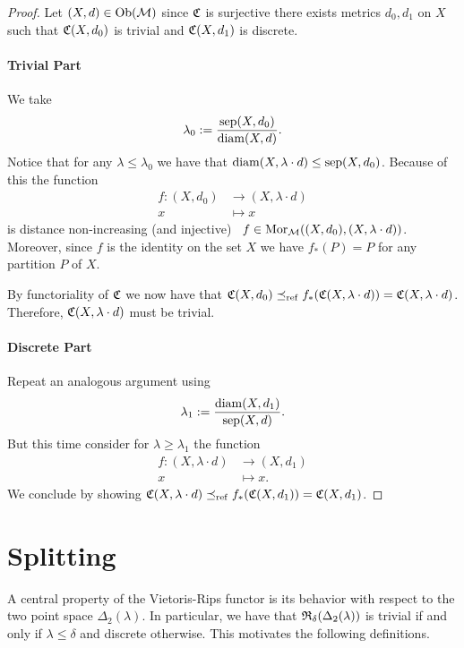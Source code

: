 \begin{proof}
    Let $(X,d) \in \mathrm {Ob}(\mathcal{M})$ since $\mathfrak{C}$ is surjective there exists metrics $d_0, d_1$ on $X$ such that $\mathfrak{C}(X,d_0)$ is trivial and $\mathfrak{C}(X,d_1)$ is discrete.

    \paragraph*{Trivial Part} We take
    $$
    \lambda_0 := \frac{\mathrm{sep}(X,d_0)}{\mathrm{diam}(X,d)}.
    $$ 
    Notice that for any $\lambda \le \lambda_0$ we have that $\mathrm{diam}(X,\lambda \cdot d) \le \mathrm{sep}(X,d_0)$.
    Because of this the function
    \begin{align*}
        f: (X, d_0) &\longrightarrow (X, \lambda \cdot d)\\
        x &\longmapsto x
    \end{align*}
    is distance non-increasing (and injective) \ie\ $f \in \mathrm {Mor}_{\mathcal{M}}((X,d_0), (X,\lambda \cdot d))$. Moreover, since $f$ is the identity on the set $X$ we have $f_*(P) = P$ for any partition $P$ of $X$.

    By functoriality of $\mathfrak{C}$ we now have that $\mathfrak{C}(X,d_0) \preceq_\mathrm{ref} f_*(\mathfrak{C}(X,\lambda \cdot d)) = \mathfrak{C}(X,\lambda \cdot d)$. Therefore, $\mathfrak{C}(X,\lambda \cdot d)$ must be trivial.

    \paragraph*{Discrete Part} Repeat an analogous argument using
    $$
    \lambda_1 := \frac{\mathrm{diam}(X,d_1)}{\mathrm{sep}(X,d)}.
    $$
    But this time consider for $\lambda \ge \lambda_1$ the function
    \begin{align*}
        f: (X, \lambda \cdot d) &\longrightarrow (X, d_1)\\
        x &\longmapsto x.
    \end{align*}
    We conclude by showing $\mathfrak{C}(X,\lambda \cdot d) \preceq_\mathrm{ref} f_*(\mathfrak{C}(X,d_1)) = \mathfrak{C}(X,d_1)$. 
\end{proof}

\section{Splitting}

A central property of the Vietoris-Rips functor is its behavior with respect to the two point space $\Delta_2(\lambda)$. In particular, we have that $\mathfrak{R}_\delta(\Delta_2(\lambda))$ is trivial if and only if $\lambda \le \delta$ and discrete otherwise.
This motivates the following definitions.

